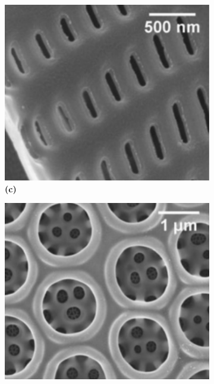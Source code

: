 \documentclass[10pt,aspectratio=1610,compress,dvipsnames]{beamer}
\begin{document}
\begin{frame}
{\begin{figure}
  \begin{subfigure}[b]{0.2\linewidth}
    \includegraphics[width=\linewidth]{Frustrulespictures/Screen Shot 2023-07-02 at 8.25.17 PM.png} %
    \caption*{\textbf{(c)}}
    \label{fig7:c}
  \end{subfigure}\hspace{0.5cm} %
  \begin{subfigure}[b]{0.2\linewidth}
    \includegraphics[width=\linewidth]{Frustrulespictures/Screen Shot 2023-07-02 at 8.25.43 PM.png} %

\end{subfigure}
\end{figure}}
\end{frame}
\end{document}
